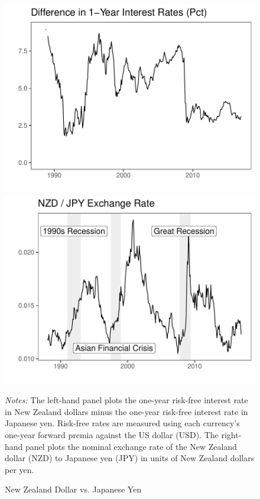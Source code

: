 \documentclass[11pt]{article}
\begin{document}
\begin{figure}[htp!]
  \centering
  \caption{New Zealand Dollar vs. Japanese Yen}
  \label{fig:fp}
  \label{fig:spot}
  \begin{minipage}[htp]{0.49\textwidth}
  \includegraphics[width=\textwidth]{Exhibits/Figure_FP12M_DiffJPYNZD.pdf}
  \end{minipage}
  \begin{minipage}[htp]{0.49\textwidth}
  \includegraphics[width=\textwidth]{Exhibits/Figure_FX_JPYNZD.pdf}
  \end{minipage}
  
  \vspace{-1em}
  \begin{minipage}[htp]{\textwidth}
  \scriptsize
  \emph{Notes:} The left-hand panel plots the one-year risk-free interest rate in New Zealand dollars minus the one-year risk-free interest rate in Japanese yen. Risk-free rates are measured using each currency's one-year forward premia against the US dollar (USD). The right-hand panel plots the nominal exchange rate of the New Zealand dollar (NZD) to Japanese yen (JPY) in units of New Zealand dollars per yen. 
  \end{minipage}
\end{figure}
\end{document}
